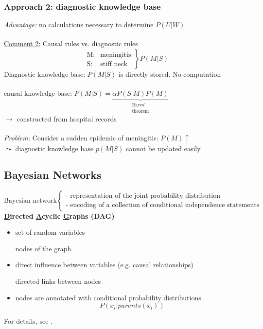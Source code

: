 \subsubsection*{Approach 2: diagnostic knowledge base}
\emph{Advantage:} no calculations necessary to determine $P(U|W)$
\\\\
\underline{Comment 2:} Causal rules vs. diagnostic rules
\[ \left. \begin{array}{ll}
	\text{M:} & \text{meningitis} \\
	\text{S:} & \text{stiff neck}
\end{array} \right \} P(M|S) \]
Diagnostic knowledge base: $P(M|S)$ is directly stored. No computation
\\\\
causal knowledge base: $P(M|S) = \underbrace{ \alpha P(S|M) P(M) }_{
	\substack{\text{Bayes'} \\ \text{theorem}}}$\\
\indent $\rightarrow$ constructed from hospital records
\\\\
\emph{Problem:} Consider a sudden epidemic of meningitis: $P(M) \uparrow$ \\
\indent $\leadsto$ diagnostic knowledge base $p(M|S)$ cannot be updated easily


\newpage					%
\subsection{Bayesian Networks}
\[ \text{Bayesian network} \left \{ \begin{array}{l}
	\text{- representation of the joint probability distribution} \\
	\text{- encoding of a collection of conditional independence statements}
\end{array} \right. \]
{\bf \underline{D}irected \underline{A}cyclic \underline{G}raphs (DAG)}
\begin{itemize}
	\item set of random variables 
		\begin{itemize}
			\itl nodes of the graph
		\end{itemize}
	\item direct influence between variables (e.g. causal relationships)
	\begin{itemize}
		\itl directed links between nodes
	\end{itemize}
	\item nodes are annotated with conditional probability distributions
		\[ P(x_i| parents(x_i)) \]
\end{itemize}
For details, see \textcite[ch. 14: Probabilistic Reasoning]{RussellNorvig2003}. 

